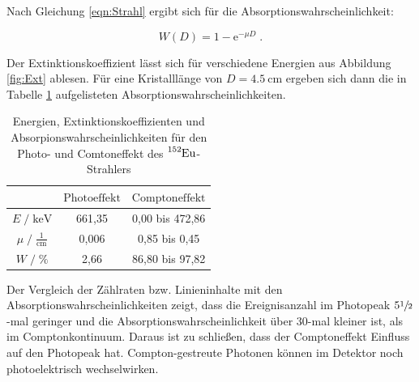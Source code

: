 Nach Gleichung \eqref{eqn:Strahl} ergibt sich für die Absorptionswahrscheinlichkeit:

\begin{equation}
  W(D) = 1 - \text{e}^{- \mu D} \; .
\end{equation}

Der Extinktionskoeffizient lässt sich für verschiedene Energien aus Abbildung \ref{fig:Ext} ablesen.
Für eine Kristalllänge von $D = \SI{4.5}{\centi\meter}$ ergeben sich dann die in Tabelle \ref{tab:mess3}
aufgelisteten Absorptionswahrscheinlichkeiten.

\begin{table}
  \centering
  \caption{Energien, Extinktionskoeffizienten und Absorpionswahrscheinlichkeiten für den Photo- und Comtoneffekt des $\ce{^{152}Eu}$-Strahlers}
  \label{tab:mess3}
  \begin{tabular}{c c c }
  \toprule
  $ $ & $\text{Photoeffekt}$ & $\text{Comptoneffekt}$ \\
  \midrule
  $E \;/\; \si{\kilo\eV}$                 & 661,35 & 0,00 bis 472,86  \\
  $\mu \;/\; \frac{1}{\si{\centi\meter}}$ & 0,006  & 0,85 bis 0,45 \\
  $W \;/\; \si{\percent}$                 & 2,66   & 86,80 bis 97,82 \\
  \bottomrule
  \end{tabular}
\end{table}

Der Vergleich der Zählraten bzw. Linieninhalte mit den Absorptionswahrscheinlichkeiten zeigt, dass die Ereignisanzahl im Photopeak 
$5 \sfrac{1}{2}$-mal geringer und die Absorptionswahrscheinlichkeit über $30$-mal kleiner ist, als im Comptonkontinuum.
Daraus ist zu schließen, dass der Comptoneffekt Einfluss auf den Photopeak hat. Compton-gestreute Photonen können im 
Detektor noch photoelektrisch wechselwirken.

